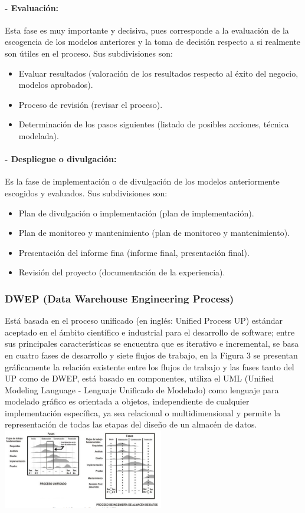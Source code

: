\documentclass[twoside,twocolumn]{article}
\begin{document}
\paragraph{- Evaluación:}
Esta fase es muy importante y decisiva, pues corresponde a 
la evaluación de la escogencia de los modelos anteriores y la toma de 
decisión respecto a si realmente son útiles en el proceso. Sus 
subdivisiones son: 
\begin{itemize}
    \item Evaluar resultados (valoración de los resultados respecto al éxito del negocio, modelos aprobados).
    \item Proceso de revisión (revisar el proceso).
    \item Determinación de los pasos siguientes (listado de posibles acciones, técnica modelada).  
\end{itemize}

\paragraph{- Despliegue o divulgación:}
Es la fase de implementación o de 
divulgación de los modelos anteriormente escogidos y evaluados. Sus 
subdivisiones son: 

\begin{itemize}
    \item Plan de divulgación o implementación (plan de implementación).
    \item Plan de monitoreo y mantenimiento (plan de monitoreo y mantenimiento).
    \item Presentación del informe fina (informe final, presentación final).
    \item Revisión del proyecto (documentación de la experiencia). 
\end{itemize}
\subsubsection{DWEP (Data Warehouse Engineering Process)}
Está basada en el proceso unificado (en inglés: Unified Process UP) estándar aceptado en el ámbito científico e industrial para el desarrollo de software; entre sus principales características se encuentra que es iterativo e incremental, se basa en cuatro fases de desarrollo y siete flujos de trabajo, en la Figura 3 se presentan gráficamente la relación existente entre los flujos de trabajo y las fases tanto del UP como de DWEP, está basado en componentes, utiliza el UML (Unified Modeling Language - Lenguaje Unificado de Modelado) como lenguaje para modelado gráfico es orientada a objetos, independiente de cualquier implementación específica, ya sea relacional o multidimensional y permite la representación de todas las etapas del diseño de un almacén de datos. 
\includegraphics[width=7cm]{imagenes/img4.png}
\end{document}
